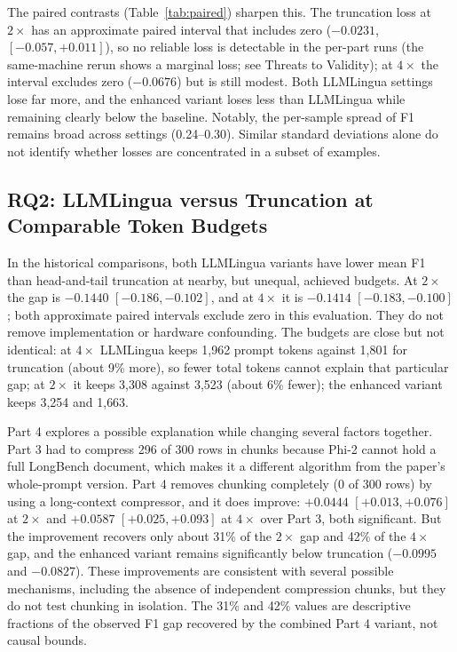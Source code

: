 \documentclass[10pt,a4paper,twocolumn]{article}
\begin{document}
The paired contrasts (Table~\ref{tab:paired}) sharpen this. The truncation loss at
$2\times$ has an approximate paired interval that includes zero
($-0.0231$, $[-0.057,+0.011]$), so no reliable loss is detectable in the per-part runs (the same-machine rerun shows a marginal loss; see Threats to Validity); at $4\times$ the interval excludes zero
($-0.0676$) but is still modest. Both LLMLingua settings lose far more, and the
enhanced variant loses less than LLMLingua while remaining clearly below the
baseline. Notably, the per-sample spread of F1 remains broad across settings (0.24--0.30). Similar standard deviations alone do not identify whether losses are concentrated in a subset of examples.

\subsection{RQ2: LLMLingua versus Truncation at Comparable Token Budgets}
\label{sec:rq2}

In the historical comparisons, both LLMLingua variants have lower mean F1 than head-and-tail truncation at nearby, but unequal, achieved budgets. At $2\times$ the gap is $-0.1440$
$[-0.186,-0.102]$, and at $4\times$ it is $-0.1414$ $[-0.183,-0.100]$; both
approximate paired intervals exclude zero in this evaluation. They do not remove implementation or hardware confounding. The budgets are close but not identical: at $4\times$ LLMLingua keeps 1{,}962 prompt tokens against 1{,}801 for truncation (about 9\% more), so fewer total tokens cannot explain that particular gap; at $2\times$ it keeps 3{,}308 against 3{,}523 (about 6\% fewer); the enhanced variant keeps 3{,}254 and 1{,}663.

Part 4 explores a possible explanation while changing several factors together. Part 3 had to compress 296 of
300 rows in chunks because Phi-2 cannot hold a full LongBench document, which makes
it a different algorithm from the paper's whole-prompt version. Part 4 removes
chunking completely (0 of 300 rows) by using a long-context compressor, and it does
improve: $+0.0444$ $[+0.013,+0.076]$ at $2\times$ and $+0.0587$
$[+0.025,+0.093]$ at $4\times$ over Part 3, both significant. But the improvement
recovers only about 31\% of the $2\times$ gap and 42\% of the $4\times$ gap, and
the enhanced variant remains significantly below truncation
($-0.0995$ and $-0.0827$). These improvements are consistent with several possible mechanisms, including
the absence of independent compression chunks, but they do not test chunking in
isolation. The 31\% and 42\% values are descriptive fractions of the observed F1
gap recovered by the combined Part 4 variant, not causal bounds.
\end{document}
